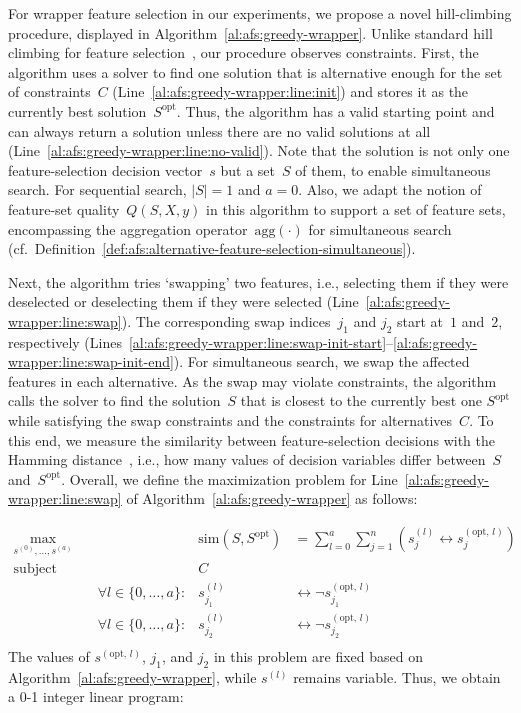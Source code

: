 \documentclass{article}
\theoremstyle{definition}
\begin{document}
For wrapper feature selection in our experiments, we propose a novel hill-climbing procedure, displayed in Algorithm~\ref{al:afs:greedy-wrapper}.
Unlike standard hill climbing for feature selection~\cite{kohavi1997wrappers}, our procedure observes constraints.
First, the algorithm uses a solver to find one solution that is alternative enough for the set of constraints~$C$ (Line~\ref{al:afs:greedy-wrapper:line:init}) and stores it as the currently best solution~$S^{\text{opt}}$.
Thus, the algorithm has a valid starting point and can always return a solution unless there are no valid solutions at all (Line~\ref{al:afs:greedy-wrapper:line:no-valid}).
Note that the solution is not only one feature-selection decision vector~$s$ but a set~$S$ of them, to enable simultaneous search.
For sequential search, $|S| = 1$ and $a=0$.
Also, we adapt the notion of feature-set quality~$Q(S,X,y)$ in this algorithm to support a set of feature sets, encompassing the aggregation operator~$\text{agg}(\cdot)$ for simultaneous search (cf.~Definition~\ref{def:afs:alternative-feature-selection-simultaneous}).

Next, the algorithm tries `swapping' two features, i.e., selecting them if they were deselected or deselecting them if they were selected (Line~\ref{al:afs:greedy-wrapper:line:swap}).
The corresponding swap indices~$j_1$ and $j_2$ start at~$1$ and~$2$, respectively (Lines~\ref{al:afs:greedy-wrapper:line:swap-init-start}--\ref{al:afs:greedy-wrapper:line:swap-init-end}).
For simultaneous search, we swap the affected features in each alternative.
As the swap may violate constraints, the algorithm calls the solver to find the solution~$S$ that is closest to the currently best one $S^{\text{opt}}$ while satisfying the swap constraints and the constraints for alternatives~$C$.
To this end, we measure the similarity between feature-selection decisions with the Hamming distance~\cite{choi2010survey}, i.e., how many values of decision variables differ between~$S$ and~$S^{\text{opt}}$.
Overall, we define the maximization problem for Line~\ref{al:afs:greedy-wrapper:line:swap} of Algorithm~\ref{al:afs:greedy-wrapper} as follows:

\begin{equation}
	\begin{aligned}
		\max_{s^{(0)}, \dots, s^{(a)}} &\quad & \text{sim}(S, S^{\text{opt}}) &= \sum_{l=0}^{a} \sum_{j=1}^{n} \left( s^{(l)}_j \leftrightarrow s^{(\text{opt, } l)}_{j} \right) \\
		\text{subject to:} &\quad & C & \\
		&\quad \forall l \in \{0, \dots, a\}: & s^{(l)}_{j_1} &\leftrightarrow \neg s^{(\text{opt, } l)}_{j_1} \\
		&\quad \forall l \in \{0, \dots, a\}: & s^{(l)}_{j_2} &\leftrightarrow \neg s^{(\text{opt, } l)}_{j_2} \\
	\end{aligned}
	\label{eq:afs:greedy-wrapper-problem}
\end{equation}
%
The values of $s^{(\text{opt, } l)}$, $j_1$, and $j_2$ in this problem are fixed based on Algorithm~\ref{al:afs:greedy-wrapper}, while $s^{(l)}$ remains variable.
Thus, we obtain a 0-1 integer linear program:
\end{document}
